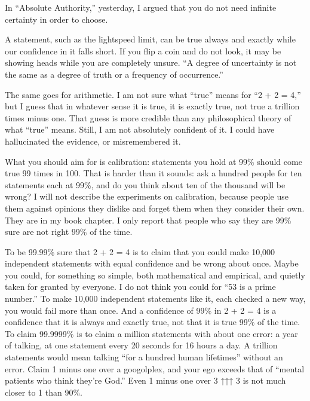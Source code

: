 
In ``Absolute Authority,'' yesterday, I argued that you do not need infinite certainty in order to choose.

A statement, such as the lightspeed limit, can be true always and exactly while our confidence in it falls short. If you flip a coin and do not look, it may be showing heads while you are completely unsure. ``A degree of uncertainty is not the same as a degree of truth or a frequency of occurrence.''

The same goes for arithmetic. I am not sure what ``true'' means for ``2 + 2 = 4,'' but I guess that in whatever sense it is true, it is exactly true, not true a trillion times minus one. That guess is more credible than any philosophical theory of what ``true'' means. Still, I am not absolutely confident of it. I could have hallucinated the evidence, or misremembered it. 

What you should aim for is calibration: statements you hold at 99\% should come true 99 times in 100. That is harder than it sounds: ask a hundred people for ten statements each at 99\%, and do you think about ten of the thousand will be wrong? I will not describe the experiments on calibration, because people use them against opinions they dislike and forget them when they consider their own. They are in my book chapter. I only report that people who say they are 99\% sure are not right 99\% of the time. 

To be 99.99\% sure that 2 + 2 = 4 is to claim that you could make 10,000 independent statements with equal confidence and be wrong about once. Maybe you could, for something so simple, both mathematical and empirical, and quietly taken for granted by everyone. I do not think you could for ``53 is a prime number.'' To make 10,000 independent statements like it, each checked a new way, you would fail more than once. And a confidence of 99\% in 2 + 2 = 4 is a confidence that it is always and exactly true, not that it is true 99\% of the time. To claim 99.9999\% is to claim a million statements with about one error: a year of talking, at one statement every 20 seconds for 16 hours a day.  A trillion statements would mean talking ``for a hundred human lifetimes'' without an error.  Claim 1 minus one over a googolplex, and your ego exceeds that of ``mental patients who think they're God.'' Even 1 minus one over 3 ↑↑↑ 3 is not much closer to 1 than 90\%. 

